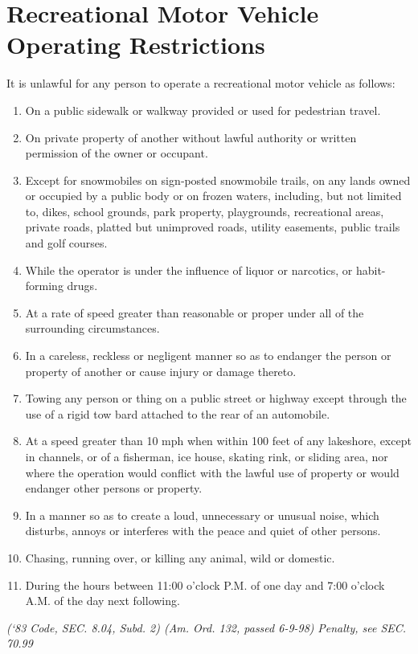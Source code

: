 \section{Recreational Motor Vehicle Operating Restrictions}
It is unlawful for any person to operate a recreational motor vehicle as follows:
\begin{enumerate}[{\indent}A)]
    \item On a public sidewalk or walkway provided or used for pedestrian travel.
    \item On private property of another without lawful authority or written permission of the owner or occupant.
    \item Except for snowmobiles on sign‑posted snowmobile trails, on any lands owned or occupied by a public body or on frozen waters, including, but not limited to, dikes, school grounds, park property, playgrounds, recreational areas, private roads, platted but unimproved roads, utility easements, public trails and golf courses.
    \item While the operator is under the influence of liquor or narcotics, or habit-forming drugs.
    \item At a rate of speed greater than reasonable or proper under all of the surrounding circumstances.
    \item In a careless, reckless or negligent manner so as to endanger the person or property of another or cause injury or damage thereto.
    \item Towing any person or thing on a public street or highway except through the use of a rigid tow bard attached to the rear of an automobile.
    \item At a speed greater than 10 mph when within 100 feet of any lakeshore, except in channels, or of a fisherman, ice house, skating rink, or sliding area, nor where the operation would conflict with the lawful use of property or would endanger other persons or property.
    \item In a manner so as to create a loud, unnecessary or unusual noise, which disturbs, annoys or interferes with the peace and quiet of other persons.
    \item Chasing, running over, or killing any animal, wild or domestic.
    \item During the hours between 11:00 o'clock P.M. of one day and 7:00 o'clock A.M. of the day next following.
\end{enumerate}
\emph{(‘83 Code, SEC. 8.04, Subd. 2) (Am. Ord. 132, passed 6-9-98)}
\emph{Penalty, see SEC. 70.99}

